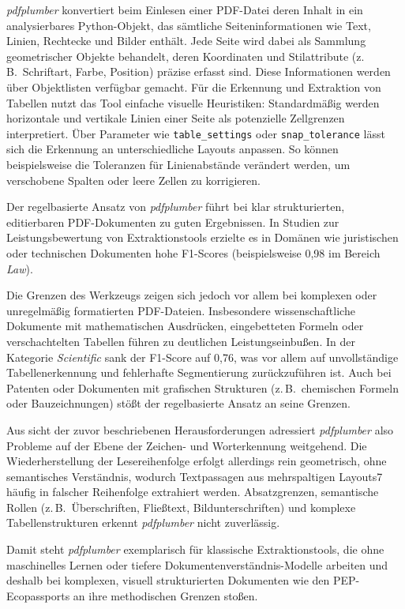 \emph{pdfplumber} konvertiert beim Einlesen einer PDF-Datei deren Inhalt in ein analysierbares Python-Objekt, das sämtliche Seiteninformationen
wie Text, Linien, Rechtecke und Bilder enthält. Jede Seite wird dabei als Sammlung geometrischer Objekte behandelt, deren Koordinaten und Stilattribute 
(z.\,B.\ Schriftart, Farbe, Position) präzise erfasst sind. \cite{Yang2025} 
Diese Informationen werden über Objektlisten verfügbar gemacht. 
Für die Erkennung und Extraktion von Tabellen nutzt das Tool einfache visuelle Heuristiken: Standardmäßig werden horizontale und vertikale Linien
einer Seite als potenzielle Zellgrenzen interpretiert.  \cite{Yang2025}
Über Parameter wie \texttt{table\_settings} oder \texttt{snap\_tolerance} lässt sich die Erkennung an unterschiedliche Layouts anpassen. 
So können beispielsweise die Toleranzen für Linienabstände verändert werden, um verschobene Spalten oder leere Zellen zu korrigieren. \cite{Yang2025}

Der regelbasierte Ansatz von \emph{pdfplumber} führt bei klar strukturierten, editierbaren PDF-Dokumenten zu guten Ergebnissen. 
In Studien zur Leistungsbewertung von Extraktionstools erzielte es in Domänen wie juristischen oder technischen
Dokumenten hohe F1-Scores (beispielsweise 0{,}98 im Bereich \emph{Law}). \cite{Adhikari2025}

Die Grenzen des Werkzeugs zeigen sich jedoch vor allem bei komplexen oder unregelmäßig formatierten PDF-Dateien. 
Insbesondere wissenschaftliche Dokumente mit mathematischen Ausdrücken, eingebetteten Formeln oder verschachtelten Tabellen führen zu deutlichen Leistungseinbußen. 
In der Kategorie \emph{Scientific} sank der F1-Score auf 0{,}76, was vor allem auf unvollständige Tabellenerkennung und fehlerhafte Segmentierung zurückzuführen ist. 
Auch bei Patenten oder Dokumenten mit grafischen Strukturen (z.\,B.\ chemischen Formeln oder Bauzeichnungen) stößt der regelbasierte Ansatz an seine Grenzen. \cite{Adhikari2025}

Aus sicht der zuvor beschriebenen Herausforderungen adressiert \emph{pdfplumber} also Probleme auf der Ebene der Zeichen- und Worterkennung weitgehend.
Die Wiederherstellung der Lesereihenfolge erfolgt allerdings rein geometrisch, ohne semantisches Verständnis, wodurch Textpassagen aus mehrspaltigen Layouts7
häufig in falscher Reihenfolge extrahiert werden. 
Absatzgrenzen, semantische Rollen (z.\,B.\ Überschriften, Fließtext, Bildunterschriften) und komplexe Tabellenstrukturen erkennt \emph{pdfplumber} nicht zuverlässig.

Damit steht \emph{pdfplumber} exemplarisch für klassische Extraktionstools, die ohne maschinelles Lernen oder tiefere Dokumentenverständnis-Modelle
arbeiten und deshalb bei komplexen, visuell strukturierten Dokumenten wie den PEP-Ecopassports an ihre methodischen Grenzen stoßen.




